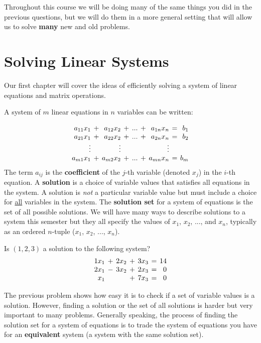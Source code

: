 Throughout this course we will be doing many of the same things you did in the previous questions, but we will do them in a more general setting that will allow us to solve \textbf{many} new and old problems.

\newpage
\section{Solving Linear Systems}
Our first chapter will cover the ideas of efficiently solving a system of linear equations and matrix operations.

A system of $m$ linear equations in $n$ variables can be written:

\begin{equation*}
\setlength{\arraycolsep}{2pt}
\begin{array}{rcrcrcrcr}
  a_{11} x_1  &+& a_{12} x_2 &+& ... &+&  a_{1n}x_n &=& b_1 \\ 
  a_{21} x_1  &+& a_{22} x_2 &+& ... &+&  a_{2n}x_n &=& b_2 \\
  \vdots  & & \vdots & &  & &  \vdots &&  \\
  a_{m1} x_1  &+& a_{m2} x_2 &+& ... &+&  a_{mn}x_n &=& b_m
\end{array}
\end{equation*}
The term $a_{ij}$ is the \textbf{coefficient} of the $j$-th variable (denoted $x_j$) in the $i$-th equation. A \textbf{solution} is a choice of variable values that satisfies all equations in the system. A solution is \emph{not} a particular variable value but must include a choice for \underline{all} variables in the system. The \textbf{solution set} for a system of equations is the set of all possible solutions. We will have many ways to describe solutions to a system this semester but they all specify the values of $x_1$, $x_2$, ..., and $x_n$, typically as an ordered $n$-tuple ($x_1$, $x_2$, ..., $x_n$).

\bq Is $(1,2,3)$ a solution to the following system?
\begin{equation*}
\setlength{\arraycolsep}{2pt}
\begin{array}{rcrcrcrcr}
  1 x_1  &+& 2 x_2 &+& 3 x_3 &=& 14 \\ %
  2 x_1  &-& 3 x_2 &+& 2 x_3 &=& 0 \\
   x_1   & &       &+& 7 x_3 &=& 0
\end{array}
\end{equation*}
\eq

The previous problem shows how easy it is to check if a set of variable values is a solution. However, finding a solution or the set of all solutions is harder but very important to many problems. Generally speaking, the process of finding the solution set for a system of equations is to trade the system of equations you have for an \textbf{equivalent} system (a system with the same solution set).


